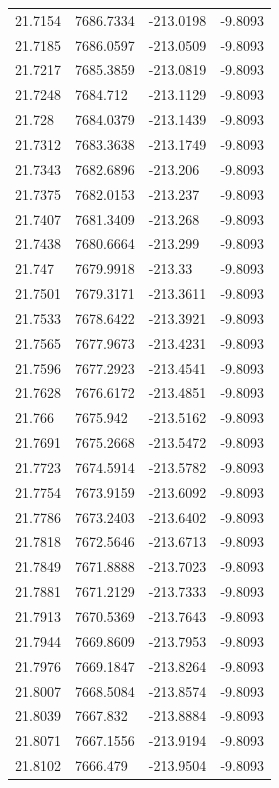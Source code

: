 \begin{table}[H]
\begin{tabular}{llll}
21.7154 & 7686.7334 & -213.0198 & -9.8093 \\
21.7185 & 7686.0597 & -213.0509 & -9.8093 \\
21.7217 & 7685.3859 & -213.0819 & -9.8093 \\
21.7248 & 7684.712 & -213.1129 & -9.8093 \\
21.728 & 7684.0379 & -213.1439 & -9.8093 \\
21.7312 & 7683.3638 & -213.1749 & -9.8093 \\
21.7343 & 7682.6896 & -213.206 & -9.8093 \\
21.7375 & 7682.0153 & -213.237 & -9.8093 \\
21.7407 & 7681.3409 & -213.268 & -9.8093 \\
21.7438 & 7680.6664 & -213.299 & -9.8093 \\
21.747 & 7679.9918 & -213.33 & -9.8093 \\
21.7501 & 7679.3171 & -213.3611 & -9.8093 \\
21.7533 & 7678.6422 & -213.3921 & -9.8093 \\
21.7565 & 7677.9673 & -213.4231 & -9.8093 \\
21.7596 & 7677.2923 & -213.4541 & -9.8093 \\
21.7628 & 7676.6172 & -213.4851 & -9.8093 \\
21.766 & 7675.942 & -213.5162 & -9.8093 \\
21.7691 & 7675.2668 & -213.5472 & -9.8093 \\
21.7723 & 7674.5914 & -213.5782 & -9.8093 \\
21.7754 & 7673.9159 & -213.6092 & -9.8093 \\
21.7786 & 7673.2403 & -213.6402 & -9.8093 \\
21.7818 & 7672.5646 & -213.6713 & -9.8093 \\
21.7849 & 7671.8888 & -213.7023 & -9.8093 \\
21.7881 & 7671.2129 & -213.7333 & -9.8093 \\
21.7913 & 7670.5369 & -213.7643 & -9.8093 \\
21.7944 & 7669.8609 & -213.7953 & -9.8093 \\
21.7976 & 7669.1847 & -213.8264 & -9.8093 \\
21.8007 & 7668.5084 & -213.8574 & -9.8093 \\
21.8039 & 7667.832 & -213.8884 & -9.8093 \\
21.8071 & 7667.1556 & -213.9194 & -9.8093 \\
21.8102 & 7666.479 & -213.9504 & -9.8093 \\

\end{tabular}
\end{table}
